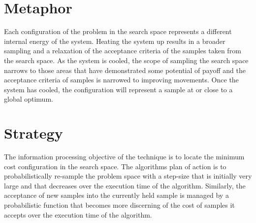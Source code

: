 \documentclass[a4paper, 11pt]{article}
\begin{document}
\section{Metaphor}
\label{sec:metaphor}
Each configuration of the problem in the search space represents a different internal energy of the system. Heating the system up results in a broader sampling and a relaxation of the acceptance criteria of the samples taken from the search space. As the system is cooled, the scope of sampling the search space narrows to those areas that have demonstrated some potential of payoff and the acceptance criteria of samples is narrowed to improving movements. Once the system has cooled, the configuration will represent a sample at or close to a global optimum. 


\section{Strategy}
\label{sec:strategy}
The information processing objective of the technique is to locate the minimum cost configuration in the search space.
The algorithms plan of action is to probabilistically re-sample the problem space with a step-size that is initially very large and that decreases over the execution time of the algorithm. Similarly, the acceptance of new samples into the currently held sample is managed by a probabilistic function that becomes more discerning of the cost of samples it accepts over the execution time of the algorithm.
\end{document}
